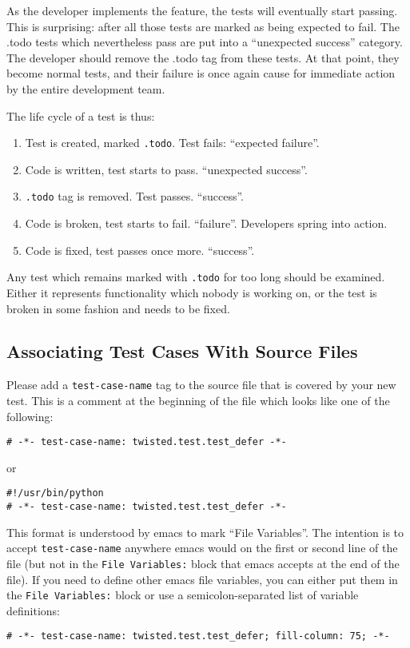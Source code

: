 As the developer implements the feature, the tests will eventually start passing. This is surprising: after all those tests are marked as being expected to fail. The .todo tests which nevertheless pass are put into a ``unexpected success'' category. The developer should remove the .todo tag from these tests. At that point, they become normal tests, and their failure is once again cause for immediate action by the entire development team.

The life cycle of a test is thus:\begin{enumerate}
\item Test is created, marked \texttt{.todo}. Test fails: ``expected   failure''.
\item Code is written, test starts to pass. ``unexpected success''.
\item \texttt{.todo} tag is removed. Test passes. ``success''.
\item Code is broken, test starts to fail. ``failure''. Developers spring   into action.
\item Code is fixed, test passes once more. ``success''.
\end{enumerate}


Any test which remains marked with \texttt{.todo} for too long should be examined. Either it represents functionality which nobody is working on, or the test is broken in some fashion and needs to be fixed.

\subsection{Associating Test Cases With Source Files}


Please add a \texttt{test-case-name} tag to the source file that is covered by your new test. This is a comment at the beginning of the file which looks like one of the following:\begin{verbatim}
# -*- test-case-name: twisted.test.test_defer -*-
\end{verbatim}


or\begin{verbatim}
#!/usr/bin/python
# -*- test-case-name: twisted.test.test_defer -*-
\end{verbatim}


This format is understood by emacs to mark ``File Variables''. The intention is to accept \texttt{test-case-name} anywhere emacs would on the first or second line of the file (but not in the \texttt{File Variables:} block that emacs accepts at the end of the file). If you need to define other emacs file variables, you can either put them in the \texttt{File Variables:} block or use a semicolon-separated list of variable definitions:\begin{verbatim}
# -*- test-case-name: twisted.test.test_defer; fill-column: 75; -*-
\end{verbatim}


